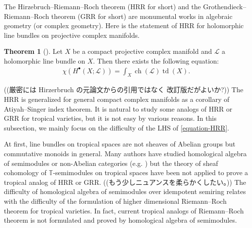 \documentclass[a4paper,dvipdfmx,reqno,12pt]{amsart}
\theoremstyle{definition}
\newtheorem{theorem}{Theorem}[section]
\newcommand{\opn}[1]{\operatorname{#1}}
\numberwithin{equation}{section}
\begin{document}
The Hirzebruch--Riemann--Roch theorem (HRR for short) and the Grothendieck--
Riemann--Roch theorem (GRR for short) 
are monumental works in
algebraic geometry (or complex geometry). 
Here is the statement of HRR for holomorphic line bundles on 
projective complex manifolds.
\begin{theorem}[{\cite{MR0202713}}]
Let $X$ be a compact projective complex manifold and
$\mathcal{L}$ a holomorphic line bundle on $X$.
Then there exists the following equation:
\begin{align} \label{equation-HRR}
\chi(H^{\bullet}(X;\mathcal{L}))
=\int_X \opn{ch}(\mathcal{L})\opn{td}(X).
\end{align}
\end{theorem}

((厳密には Hirzerbruch の元論文からの引用ではなく
改訂版だがよいか?))
The HRR is generalized for 
general compact complex 
manifolds as a corollary of Atiyah--Singer index 
theorem.
It is natural to study some analogs of HRR or GRR 
for tropical varieties, but it is not easy by various
reasons.
In this subsection, we mainly focus on the difficulty of
the LHS of \cref{equation-HRR}.

At first, line bundles on tropical spaces are not sheaves of 
Abelian groups but commutative monoids in general.
Many authors have studied homological algebra of semimodules 
or non-Abelian categories (e.g. 
\cite{MR3051517,MR3211743,MR3939048,https://doi.org/10.48550/arxiv.2202.01573})
but the theory of sheaf cohomology of 
$\mathbb{T}$-semimodules on tropical spaces 
have been not applied to prove a tropical
analog of HRR or GRR.
((もう少しニュアンスを柔らかくしたい。))
The difficulty of homological algebra of semimodules
over idempotent semiring relates 
with the difficulty of the formulation of
higher dimensional
Riemann--Roch theorem for tropical varieties.
In fact, current tropical analogs of Riemann--Roch 
theorem is not formulated and proved by 
homological algebra of semimodules.
\end{document}
